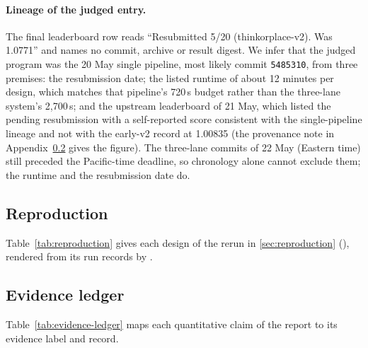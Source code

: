 \paragraph{Lineage of the judged entry.} The final leaderboard row reads
``Resubmitted 5/20 (thinkorplace-v2). Was 1.0771'' and names no commit, archive or
result digest. We infer that the judged program was the 20 May single pipeline, most
likely commit \texttt{5485310}, from three premises: the resubmission
date; the listed runtime of about 12 minutes per design, which matches that pipeline's
720\,s budget rather than the three-lane system's 2,700\,s; and the upstream leaderboard
of 21 May, which listed the pending resubmission with a self-reported score consistent
with the single-pipeline lineage and not with the early-v2 record at 1.00835 (the
provenance note in Appendix~\ref{app:records-ledger} gives the figure). The three-lane
commits of 22 May (Eastern time) still preceded the Pacific-time deadline, so
chronology alone cannot exclude them; the runtime and the resubmission date do.

\subsection{Reproduction}\label{app:records-reproduction}

Table~\ref{tab:reproduction} gives each design of the rerun in
\cref{sec:reproduction} (\reproduction), rendered from its run records by
.



\subsection{Evidence ledger}\label{app:records-ledger}

Table~\ref{tab:evidence-ledger} maps each quantitative claim of the report to its
evidence label and record.

